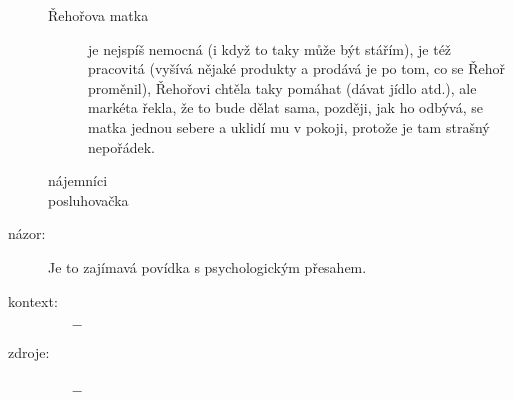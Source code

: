 \documentclass{article}
\begin{document}
\begin{description}
\begin{description}
            \item[Řehořova matka] je nejspíš nemocná (i když to taky může být stářím), je též pracovitá (vyšívá nějaké produkty a prodává je po tom, co se Řehoř proměnil), Řehořovi chtěla taky pomáhat (dávat jídlo atd.), ale markéta řekla, že to bude dělat sama, později, jak ho odbývá, se matka jednou sebere a uklidí mu v pokoji, protože je tam strašný nepořádek.
            \item[nájemníci]
            \item[posluhovačka]
        \end{description}
    \item[názor:] Je to zajímavá povídka s psychologickým přesahem.
    \item[kontext:]  \vspace{-0.5em}
        \setlength\itemsep{0em}
        \begin{itemize}
            \item[$-$]
        \end{itemize}
    \item[zdroje:] $ $
    \begin{itemize}
        \setlength\itemsep{0em}
        \item[$-$]
    \end{itemize}
\end{description}
\end{document}
